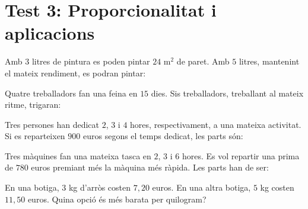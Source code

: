 \section{Test 3: Proporcionalitat i aplicacions}


\begin{enumerate}
\pregunta Amb \(3\) litres de pintura es poden pintar \(24\) m\(^2\) de paret. Amb \(5\) litres, mantenint el mateix rendiment, es podran pintar:
\begin{enumerate}
\end{enumerate}
\feedback

\pregunta Quatre treballadors fan una feina en \(15\) dies. Sis treballadors, treballant al mateix ritme, trigaran:
\begin{enumerate}
\end{enumerate}
\feedback

\pregunta Tres persones han dedicat \(2\), \(3\) i \(4\) hores, respectivament, a una mateixa activitat. Si es reparteixen \(900\) euros segons el temps dedicat, les parts són:
\begin{enumerate}
\end{enumerate}
\feedback

\pregunta Tres màquines fan una mateixa tasca en \(2\), \(3\) i \(6\) hores. Es vol repartir una prima de \(780\) euros premiant més la màquina més ràpida. Les parts han de ser:
\begin{enumerate}
\end{enumerate}
\feedback

\pregunta En una botiga, \(3\) kg d'arròs costen \(7{,}20\) euros. En una altra botiga, \(5\) kg costen \(11{,}50\) euros. Quina opció és més barata per quilogram?
\begin{enumerate}
\end{enumerate}
\feedback


\end{enumerate}
